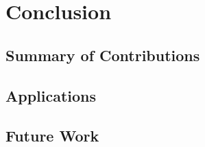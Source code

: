 \chapter{Conclusion}

\label{ch:conclusions}

\section{Summary of Contributions}

\section{Applications}

\section{Future Work}
